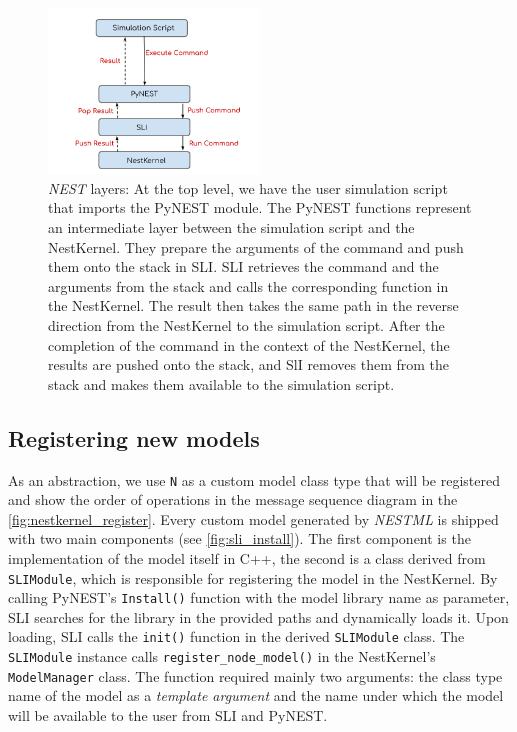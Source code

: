 \begin{figure}[h!]
\centering
\includegraphics[width=0.5\textwidth]{src/pic/layers.png}
\caption{\emph{NEST} layers: At the top level, we have the user simulation script that imports the PyNEST module. The PyNEST functions represent an intermediate layer between the simulation script and the NestKernel. They prepare the arguments of the command and push them onto the stack in SLI. SLI retrieves the command and the arguments from the stack and calls the corresponding function in the NestKernel. The result then takes the same path in the reverse direction from the NestKernel to the simulation script. After the completion of the command in the context of the NestKernel, the results are pushed onto the stack, and SlI removes them from the stack and makes them available to the simulation script.}
\label{fig:layer}
\end{figure}

\subsection{Registering new models}

As an abstraction, we use \texttt{N} as a custom model class type that will be registered and show the order of operations in the message sequence diagram in the \autoref{fig:nestkernel_register}. Every custom model generated by \emph{NESTML} is shipped with two main components (see \autoref{fig:sli_install}). The first component is the implementation of the model itself in C++, the second is a class derived from \texttt{SLIModule}, which is responsible for registering the model in the NestKernel. By calling PyNEST's \texttt{Install()} function with the model library name as parameter, SLI searches for the library in the provided paths and dynamically loads it. Upon loading, SLI calls the \texttt{init()} function in the derived \texttt{SLIModule} class. The \texttt{SLIModule} instance calls \texttt{register\_node\_model()} in the NestKernel's \texttt{ModelManager} class. The function required mainly two arguments: the class type name of the model as a \emph{template argument} and the name under which the model will be available to the user from SLI and PyNEST.

